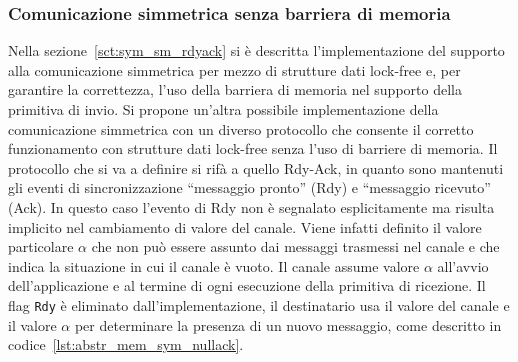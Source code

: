 \subsubsection{Comunicazione simmetrica senza barriera di memoria}
\label{sct:sym_sm_nullack}
Nella sezione~\ref{sct:sym_sm_rdyack} si \`e descritta l'implementazione del supporto alla comunicazione simmetrica per mezzo di strutture dati lock-free e, per garantire la correttezza, l'uso della barriera di memoria nel supporto della primitiva di invio. Si propone un'altra possibile implementazione della comunicazione simmetrica con un diverso protocollo che consente il corretto funzionamento con strutture dati lock-free senza l'uso di barriere di memoria. Il protocollo che si va a definire si rif\`a a quello Rdy-Ack, in quanto sono mantenuti gli eventi di sincronizzazione ``messaggio pronto'' (Rdy) e ``messaggio ricevuto'' (Ack). In questo caso l'evento di Rdy non \`e segnalato esplicitamente ma risulta implicito nel cambiamento di valore del canale. Viene infatti definito il valore particolare $\alpha$ che non pu\`o essere assunto dai messaggi trasmessi nel canale e che indica la situazione in cui il canale \`e vuoto. 
Il canale assume valore $\alpha$ all'avvio dell'applicazione e al termine di ogni esecuzione della primitiva di ricezione.
Il flag \verb+Rdy+ \`e eliminato dall'implementazione, il destinatario usa il valore del canale e il valore $\alpha$ per determinare la presenza di un nuovo messaggio, come descritto in codice~\ref{lst:abstr_mem_sym_nullack}. 

